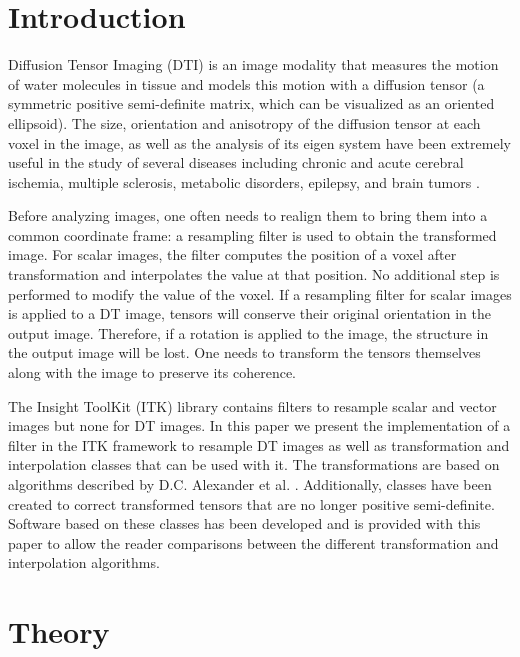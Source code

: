\documentclass{InsightArticle}
\newcommand{\IJhandlerIDnumber}{3189}
\begin{document}
\IJhandlenote{\IJhandlerIDnumber}

\tableofcontents

\section{Introduction}

Diffusion Tensor Imaging (DTI) \cite{Basser1994} is an image modality that measures the motion of water molecules in tissue and models this motion with a diffusion tensor (a symmetric positive semi-definite matrix, which can be visualized as an oriented ellipsoid). The size, orientation and anisotropy of the diffusion tensor at each voxel in the image, as well as the analysis of its eigen system have been extremely useful in the study of several diseases including chronic and acute cerebral ischemia, multiple sclerosis, metabolic disorders, epilepsy, and brain tumors \cite{Dong2004}.

Before analyzing images, one often needs to realign them to bring them into a common coordinate frame: a resampling filter is used to obtain the transformed image. For scalar images, the filter computes the position of a voxel after transformation and interpolates the value at that position. No additional step is performed to modify the value of the voxel. If a resampling filter for scalar images is applied to a DT image, tensors will conserve their original orientation in the output image. Therefore, if a rotation is applied to the image, the structure in the output image will be lost. One needs to transform the tensors themselves along with the image to preserve its coherence.

The Insight ToolKit (ITK) library \cite{ITKSoftwareGuideSecondEdition} contains filters to resample scalar and vector images but none for DT images. In this paper we present the implementation of a filter in the ITK framework to resample DT images as well as transformation and interpolation classes that can be used with it. The transformations are based on algorithms described by D.C. Alexander et al. \cite{Alexander2001}. Additionally, classes have been created to correct transformed tensors that are no longer positive semi-definite. Software based on these classes has been developed and is provided with this paper to allow the reader comparisons between the different transformation and interpolation algorithms.

\section{Theory}
\end{document}
